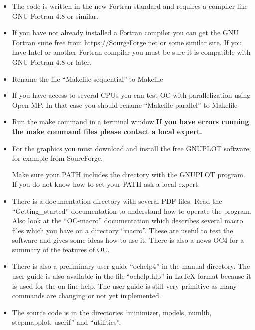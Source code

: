 \documentclass[12pt]{article}
\begin{document}
\begin{itemize}
\item The code is written in the new Fortran standard and requires a
  compiler like GNU Fortran 4.8 or similar.

\item If you have not already installed a Fortran compiler you can get
  the GNU Fortran suite free from https://SourgeForge.net or some
  similar site.  If you have Intel or another Fortran compiler you
  must be sure it is compatible with GNU Fortran 4.8 or later.

\item Rename the file ``Makefile-sequential'' to Makefile

\item If you have access to several CPUs you can test OC with
  parallelization using Open MP.  In that case you should rename
  ``Makefile-parallel'' to Makefile

\item Run the make command in a terminal window.{\bf If you have
  errors running the make command files please contact a local
  expert.}

\item For the graphics you must download and install the free GNUPLOT
  software, for example from SoureForge.

  Make sure your PATH includes the directory with the GNUPLOT program.
  If you do not know how to set your PATH ask a local expert.

\item There is a documentation directory with several PDF files.  Read
  the ``Getting\_started'' documentation to understand how to operate
  the program.  Also look at the ``OC-macro'' documentation which
  describes several macro files which you have on a directory
  ``macro''.  These are useful to test the software and gives some
  ideas how to use it.  There is also a news-OC4 for a summary of the
  features of OC.

\item There is also a preliminary user guide ``ochelp4'' in the manual
  directory.  The user guide is also available in the file
  ``ochelp.hlp'' in LaTeX format because it is used for the on line
  help.  The user guide is still very primitive as many commands are
  changing or not yet implemented.

\item The source code is in the directories ``minimizer, models,
  numlib, stepmapplot, userif'' and ``utilities''.


\end{itemize}
\end{document}

